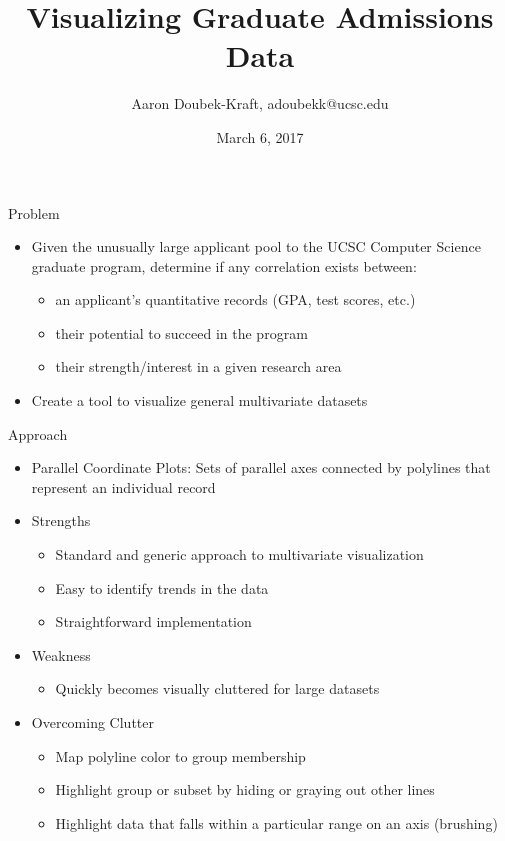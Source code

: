 \documentclass{beamer}
\title{Visualizing Graduate Admissions Data}
\author{Aaron Doubek-Kraft, adoubekk@ucsc.edu}
\date{March 6, 2017}
\begin{document}
	
	\frame{\titlepage}
	
	\begin{frame}{Problem}
		\begin{itemize}
			\item Given the unusually large applicant pool to the UCSC Computer Science graduate program, determine if any correlation exists between:
			\begin{itemize} \item an applicant's quantitative records (GPA, test scores, etc.) 
							\item their potential to succeed in the program
							\item their strength/interest in a given research area
			\end{itemize}
			\item Create a tool to visualize general multivariate datasets
		\end{itemize}	
	\end{frame}
	
	\begin{frame}{Approach}
		\begin{itemize}
			\item Parallel Coordinate Plots: Sets of parallel axes connected by polylines that represent an individual record
			\item Strengths
			\begin{itemize}
				\item Standard and generic approach to multivariate visualization
				\item Easy to identify trends in the data
				\item Straightforward implementation
			\end{itemize}
			\item Weakness
			\begin{itemize}
				\item Quickly becomes visually cluttered for large datasets
			\end{itemize}
			\item Overcoming Clutter
			\begin{itemize}
				\item Map polyline color to group membership
				\item Highlight group or subset by hiding or graying out other lines
				\item Highlight data that falls within a particular range on an axis (brushing)
			\end{itemize}
		\end{itemize}
	
	\end{frame}
	
\end{document}

